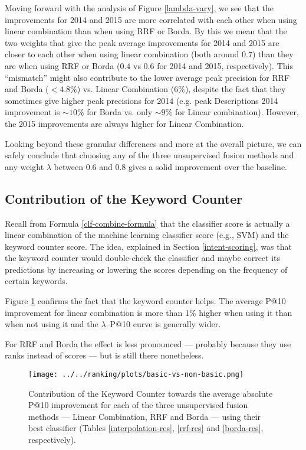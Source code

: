 Moving forward with the analysis of Figure \ref{lambda-vary}, we see that
the improvements for 2014 and 2015 are more correlated with each other when using linear combination than when using
RRF or Borda. By this we mean that the two weights that give the peak average improvements for 2014 and 2015 are closer to each other
when using linear combination (both around $0.7$) than they are when using RRF or Borda ($0.4$ vs $0.6$ for 2014 and 2015, respectively).
This ``mismatch'' might also contribute to the lower average peak precision for RRF and Borda ($<4.8\%$)
vs. Linear Combination ($6\%$), despite the fact that they sometimes
give higher peak precisions for 2014 (e.g. peak Descriptions 2014 improvement
is $\sim10\%$ for Borda vs. only $\sim9\%$ for Linear combination). However, the 2015 improvements are always higher for
Linear Combination.

Looking beyond these granular differences and more at the overall picture, we can safely conclude
that choosing any of the three unsupervised fusion methods and any weight $\lambda$ between 0.6 and 0.8 gives
a solid improvement over the baseline.

\subsection{Contribution of the Keyword Counter}
Recall from Formula \ref{clf-combine-formula} that the classifier score is actually
a linear combination of the machine learning classifier score (e.g., SVM) and the keyword counter score. The idea,
explained in Section \ref{intent-scoring},
was that the keyword counter would double-check the classifier and maybe correct its predictions by
increasing or lowering the scores depending on the frequency of certain keywords.

Figure \ref{basic-effect-plot}
confirms the fact that the keyword counter helps. The average P@10 improvement for linear combination is more than 1\% higher
when using it than when not using it and the $\lambda$--P@10 curve is generally wider.

For RRF and Borda the effect is less pronounced --- probably because they use ranks instead of scores ---
but is still there nonetheless.

\begin{figure}[h!]
\centerline{
  \texttt{[image: ../../ranking/plots/basic-vs-non-basic.png]}
  }
  \caption{Contribution of the Keyword Counter towards the average absolute P@10 improvement for each of the three unsupervised
  fusion methods --- Linear Combination, RRF and Borda --- using their best classifier (Tables \ref{interpolation-res}, \ref{rrf-res}
and \ref{borda-res}, respectively).}
  \label{basic-effect-plot}
\end{figure}

